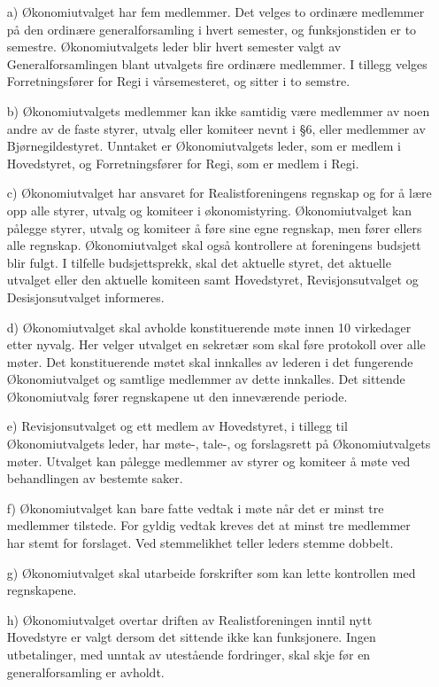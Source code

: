 \begin{itemize}
\item[a)] Økonomiutvalget har fem medlemmer. Det velges to
  ordinære medlemmer på den
ordinære generalforsamling i hvert semester, og funksjonstiden er to
semestre.  Økonomiutvalgets leder blir hvert semester valgt av
Generalforsamlingen blant utvalgets fire ordinære medlemmer. I
  tillegg velges Forretningsfører for Regi i vårsemesteret, og
  sitter i to semstre. 

\item[b)] Økonomiutvalgets medlemmer kan ikke samtidig være medlemmer av noen
andre av de faste styrer, utvalg eller komiteer nevnt i §6, eller
medlemmer av Bjørnegildestyret. Unntaket er Økonomiutvalgets leder,
som er medlem i Hovedstyret, og Forretningsfører for Regi, som er
medlem i Regi.

\item[c)] Økonomiutvalget har ansvaret for Realistforeningens regnskap og
for å lære opp alle styrer, utvalg og komiteer i økonomistyring.
Økonomiutvalget kan pålegge styrer, utvalg og komiteer å føre sine
egne regnskap, men fører ellers alle regnskap.  Økonomiutvalget skal
også kontrollere at foreningens budsjett blir fulgt.  I tilfelle
budsjettsprekk, skal det aktuelle styret, det aktuelle utvalget
eller den aktuelle komiteen samt Hovedstyret, Revisjonsutvalget og
Desisjonsutvalget informeres.

\item[d)] Økonomiutvalget skal avholde konstituerende møte innen 10 virkedager
etter nyvalg. Her velger utvalget en sekretær som skal føre protokoll
over alle møter.  Det konstituerende møtet skal innkalles av lederen i
det fungerende Økonomiutvalget og samtlige medlemmer av dette
innkalles.  Det sittende Økonomiutvalg fører regnskapene ut den 
inneværende periode.

\item[e)] Revisjonsutvalget og ett medlem av Hovedstyret, i tillegg til
Økonomiutvalgets leder, har møte-, tale-, og forslagsrett på
Økonomiutvalgets møter. Utvalget kan pålegge medlemmer av styrer og
komiteer å møte ved behandlingen av bestemte saker.

\item[f)] Økonomiutvalget kan bare fatte vedtak i møte når det er minst tre
medlemmer tilstede. For gyldig vedtak kreves det at minst tre
medlemmer har stemt for forslaget. Ved stemmelikhet teller leders
stemme dobbelt.

\item[g)] Økonomiutvalget skal utarbeide forskrifter som kan lette kontrollen
med regnskapene.

\item[h)] Økonomiutvalget overtar driften av Realistforeningen inntil nytt
Hovedstyre er valgt dersom det sittende ikke kan funksjonere. Ingen
utbetalinger, med unntak av utestående fordringer, skal skje før en
generalforsamling er avholdt.
\end{itemize}
 

